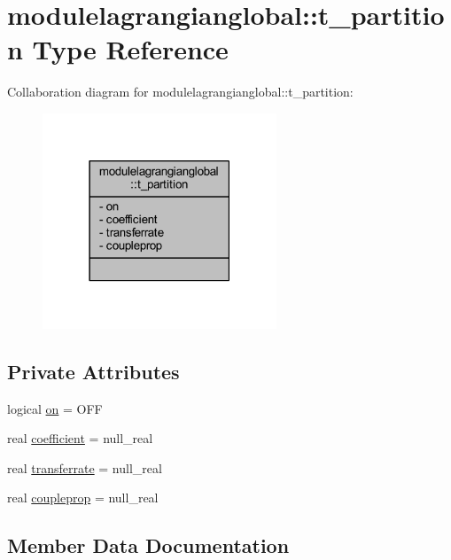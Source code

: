 \hypertarget{structmodulelagrangianglobal_1_1t__partition}{}\section{modulelagrangianglobal\+:\+:t\+\_\+partition Type Reference}
\label{structmodulelagrangianglobal_1_1t__partition}


Collaboration diagram for modulelagrangianglobal\+:\+:t\+\_\+partition\+:\nopagebreak
\begin{figure}[H]
\begin{center}
\leavevmode
\includegraphics[width=198pt]{structmodulelagrangianglobal_1_1t__partition__coll__graph}
\end{center}
\end{figure}
\subsection*{Private Attributes}
\begin{DoxyCompactItemize}
\item 
logical \mbox{\hyperlink{structmodulelagrangianglobal_1_1t__partition_afb6675b870eea2816c77dd42e7cac327}{on}} = O\+FF
\item 
real \mbox{\hyperlink{structmodulelagrangianglobal_1_1t__partition_adebeac8f6bb03df308b258291cef04dd}{coefficient}} = null\+\_\+real
\item 
real \mbox{\hyperlink{structmodulelagrangianglobal_1_1t__partition_a16115bf3f096850dfe7432065c12e707}{transferrate}} = null\+\_\+real
\item 
real \mbox{\hyperlink{structmodulelagrangianglobal_1_1t__partition_a8735a317dbaac123fa7654fd1b470110}{coupleprop}} = null\+\_\+real
\end{DoxyCompactItemize}


\subsection{Member Data Documentation}
\mbox{\label{structmodulelagrangianglobal_1_1t__partition_adebeac8f6bb03df308b258291cef04dd}} 
